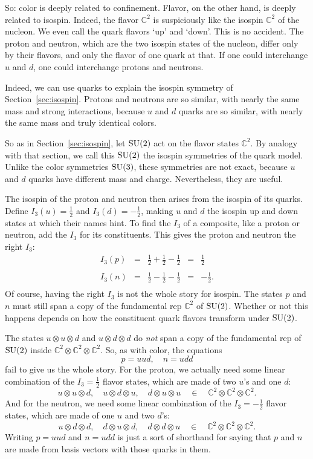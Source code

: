 \documentclass{article}
\newcommand{\C}{{\mathbb C}}  %
\newcommand{\SU}{{\rm SU}}    %
\newcommand{\half}{\frac{1}{2}} %
\begin{document}
So: color is deeply related to confinement.  Flavor, on the other hand,
is deeply related to isospin.  Indeed, the flavor $\C^2$ is
suspiciously like the isospin $\C^2$ of the nucleon.  We even call the
quark flavors `up' and `down'.  This is no accident.  The proton and
neutron, which are the two isospin states of the nucleon, differ only
by their flavors, and only the flavor of one quark at that. If one
could interchange $u$ and $d$, one could interchange protons and
neutrons.

Indeed, we can use quarks to explain the isospin symmetry of
Section~\ref{sec:isospin}. Protons and neutrons are so similar, with
nearly the same mass and strong interactions, because $u$ and $d$
quarks are so similar, with nearly the same mass and truly identical
colors.

So as in Section~\ref{sec:isospin}, let $\SU(2)$ act on the flavor
states $\C^2$. By analogy with that section, we call this $\SU(2)$ the
isospin symmetries of the quark model. Unlike the color symmetries
$\SU(3)$, these symmetries are not exact, because $u$ and $d$ quarks
have different mass and charge.  Nevertheless, they are useful.

The isospin of the proton and neutron then arises from the isospin of
its quarks. Define $I_3(u) = \half$ and $I_3(d) = -\half$, making $u$
and $d$ the isospin up and down states at which their names hint. To
find the $I_3$ of a composite, like a proton or neutron, add the $I_3$
for its constituents.  This gives the proton and neutron the right
$I_3$:
\[
\begin{array}{ccccr}
	I_3( p ) & = & \half + \half - \half &=& \half \\
                                                       \\
	I_3( n ) & = & \half - \half - \half &=& -\half. \\
\end{array}
\]
Of course, having the right $I_3$ is not the whole story for
isospin. The states $p$ and $n$ must still span a copy of the fundamental rep
$\C^2$ of $\SU(2)$. Whether or not this happens depends on how the
constituent quark flavors transform under $\SU(2)$.

The states $u \otimes u \otimes d$ and $u \otimes d \otimes d$ 
do \emph{not} span a copy of the fundamental rep of $\SU(2)$ inside
$\C^2 \otimes \C^2 \otimes \C^2$.  So, as with color, the equations
\[ p = uud, \quad n = udd \]
fail to give us the whole story. For the proton, we actually need some linear
combination of the $I_3 = \half$ flavor states, which are made of two $u$'s and
one $d$:
\[ u \otimes u \otimes d, \quad u \otimes d \otimes u, \quad d \otimes u \otimes u  \quad \in \quad \C^2 \otimes \C^2 \otimes \C^2. \]
And for the neutron, we need some linear combination of the $I_3 = -\half$ 
flavor states, which are made of one $u$ and two $d$'s:
\[ u \otimes d \otimes d, \quad d \otimes u \otimes d, \quad d \otimes d \otimes u  \quad \in \quad \C^2 \otimes \C^2 \otimes \C^2.   \]
Writing $p = uud$ and $n = udd$ is just a sort of 
shorthand for saying that $p$ and $n$ are made from basis vectors 
with those quarks in them.
\end{document}
